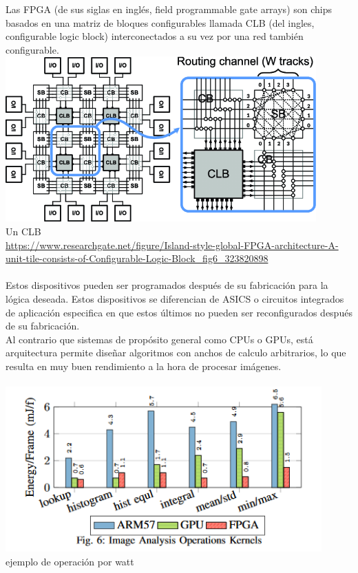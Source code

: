 Las FPGA (de sus siglas en inglés, field programmable gate arrays) son chips basados en una matriz de bloques configurables llamada CLB (del ingles, configurable logic block) interconectados a su vez por una red también configurable.
\\
\includegraphics[height=2.5in]{figures/clb.png}
\\
Un CLB
\\
\url{https://www.researchgate.net/figure/Island-style-global-FPGA-architecture-A-unit-tile-consists-of-Configurable-Logic-Block_fig6_323820898}
\\
\\
Estos dispositivos pueden ser programados después de su fabricación para la lógica deseada. Estos dispositivos se diferencian de ASICS o circuitos integrados de aplicación especifica en que estos últimos no pueden ser reconfigurados después de su fabricación.
\\
Al contrario que sistemas de propósito general como CPUs o GPUs, está arquitectura permite diseñar algoritmos con anchos de calculo arbitrarios, lo que resulta en muy buen rendimiento a la hora de procesar imágenes.
\\
\\
\includegraphics[height=2.5in]{figures/op_watt.png}
\\
ejemplo de operación por watt
